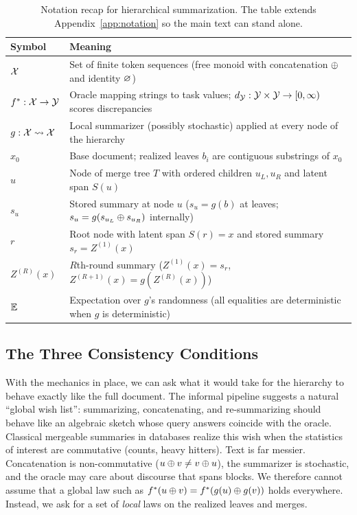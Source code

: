 \begin{table}[t]
\centering\small
\begin{tabular}{ll}
\toprule
Symbol & Meaning \\
\midrule
$\mathcal{X}$ & Set of finite token sequences (free monoid with concatenation $\oplus$ and identity $\varnothing$) \\
$f^{\ast}: \mathcal{X} \to \mathcal{Y}$ & Oracle mapping strings to task values; $d_{\mathcal{Y}}: \mathcal{Y} \times \mathcal{Y} \to [0,\infty)$ scores discrepancies \\
$g: \mathcal{X} \rightsquigarrow \mathcal{X}$ & Local summarizer (possibly stochastic) applied at every node of the hierarchy \\
$x_0$ & Base document; realized leaves $b_i$ are contiguous substrings of $x_0$ \\
$u$ & Node of merge tree $T$ with ordered children $u_L,u_R$ and latent span $S(u)$ \\
$s_u$ & Stored summary at node $u$ ($s_u=g(b)$ at leaves; $s_u=g(s_{u_L}\oplus s_{u_R})$ internally) \\
$r$ & Root node with latent span $S(r)=x$ and stored summary $s_r = Z^{(1)}(x)$ \\
$Z^{(R)}(x)$ & $R$th-round summary ($Z^{(1)}(x)=s_r$, $Z^{(R+1)}(x)=g(Z^{(R)}(x))$) \\
$\mathbb{E}$ & Expectation over $g$'s randomness (all equalities are deterministic when $g$ is deterministic) \\
\bottomrule
\end{tabular}
\caption{Notation recap for hierarchical summarization. The table extends Appendix~\ref{app:notation} so the main text can stand alone.}
\label{tab:notation-main}
\end{table}

\subsection{The Three Consistency Conditions}

With the mechanics in place, we can ask what it would take for the hierarchy to behave exactly like the full document. The informal pipeline suggests a natural ``global wish list'': summarizing, concatenating, and re-summarizing should behave like an algebraic sketch whose query answers coincide with the oracle. Classical mergeable summaries in databases \citep{agarwal2013mergeable} realize this wish when the statistics of interest are commutative (counts, heavy hitters). Text is far messier. Concatenation is non-commutative ($u \oplus v \neq v \oplus u$), the summarizer is stochastic, and the oracle may care about discourse that spans blocks. We therefore cannot assume that a global law such as $f^{\ast}(u \oplus v) = f^{\ast}(g(u) \oplus g(v))$ holds everywhere. Instead, we ask for a set of \emph{local} laws on the realized leaves and merges.

